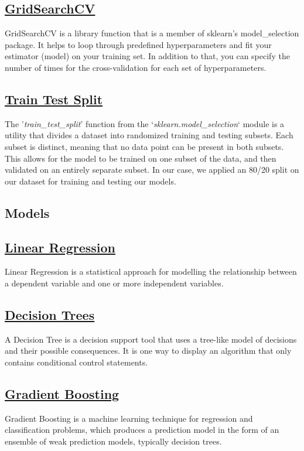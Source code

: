 \documentclass[conference]{IEEEtran}
\begin{document}
    \subsection*{\href{https://scikit-learn.org/stable/modules/generated/sklearn.model_selection.GridSearchCV.html}{GridSearchCV}}
    GridSearchCV is a library function that is a member of sklearn's model\_selection package. It helps to loop through predefined hyperparameters and fit your estimator (model) on your training set. In addition to that, you can specify the number of times for the cross-validation for each set of hyperparameters.
    
    \subsection*{\href{https://scikit-learn.org/stable/modules/generated/sklearn.model_selection.train_test_split.html}{Train Test Split}}
    The '\textit{train\_test\_split}' function from the `\textit{sklearn.model\_selection}` module is a utility that divides a dataset into randomized training and testing subsets. Each subset is distinct, meaning that no data point can be present in both subsets. This allows for the model to be trained on one subset of the data, and then validated on an entirely separate subset. In our case, we applied an 80/20 split on our dataset for training and testing our models.
    
    \subsection*{Models}
    \subsection{\href{https://en.wikipedia.org/wiki/Linear_regression}{Linear Regression}}
    Linear Regression is a statistical approach for modelling the relationship between a dependent variable and one or more independent variables.
    \subsection{\href{https://en.wikipedia.org/wiki/Decision_tree}{Decision Trees}}
    A Decision Tree is a decision support tool that uses a tree-like model of decisions and their possible consequences. It is one way to display an algorithm that only contains conditional control statements.
    \subsection{\href{https://en.wikipedia.org/wiki/Gradient_boosting}{Gradient Boosting}}
    Gradient Boosting is a machine learning technique for regression and classification problems, which produces a prediction model in the form of an ensemble of weak prediction models, typically decision trees.
\end{document}
